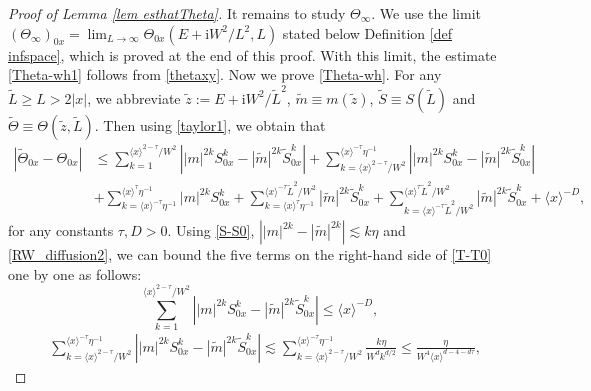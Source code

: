 \documentclass{article}
\newcommand{\1}{\mathds{1}}
\numberwithin{equation}{section}
\newcommand{\be}{\begin{equation}}
\newcommand{\ee}{\end{equation}}
\newcommand{\wh}{\widehat}
\newcommand{\wt}{\widetilde}
\newcommand{\ii}{\mathrm{i}} %
\renewcommand{\leq}{\leqslant}
\renewcommand{\geq}{\geqslant}
\renewcommand{\le}{\leq}
\renewcommand{\ge}{\geq}
\DeclareMathOperator{\OO}{O}
\theoremstyle{plain} %
\theoremstyle{remark}
\begin{document}
\begin{proof}[Proof of Lemma \ref{lem esthatTheta}]
It remains to study $\Theta_\infty$. We use the limit $(\Theta_\infty)_{0x}=\lim_{L\to\infty}\Theta_{0x}(E+\ii W^2/L^2,L)$ stated below Definition \ref{def infspace}, which is proved at the end of this proof. With this limit, the estimate \eqref{Theta-wh1} follows from \eqref{thetaxy}. Now we prove \eqref{Theta-wh}. For any $\wt L\ge L >  2|x|$, we abbreviate $\wt z:=E+\ii W^2/\wt L^2$, $\wt m\equiv m(\wt z)$, $\wt S\equiv S(\wt L)$ and $\wt\Theta\equiv \Theta(\wt z, \wt L) $. Then using \eqref{taylor1}, we obtain that 
\begin{align}
 \left|\wt\Theta_{0x}  - \Theta_{0x}\right| &\le \sum_{k=1}^{ \langle x\rangle^{2-\tau}/W^2} \left||m|^{2k}S^k_{0x} -|\wt m|^{2k}\wt S^k _{0x}\right| + \sum_{k= \langle x\rangle^{2-\tau}/W^2}^{\langle x\rangle^{-\tau}\eta^{-1}} \left||m|^{2k}S^k_{0x} -|\wt m|^{2k}\wt S^k _{0x}\right|   \nonumber\\
&+ \sum_{k=\langle x\rangle^{-\tau}\eta^{-1}}^{\langle x\rangle^\tau\eta^{-1}} |m|^{2k} S^k_{0x}+ \sum_{k=\langle x\rangle^\tau \eta^{-1}}^{ \langle x\rangle^{-\tau}\wt L^2/W^2} |\wt m|^{2k} \wt S^k_{0x} + \sum_{k=\langle x\rangle^{-\tau}\wt L^2/W^2}^{\langle x\rangle^\tau \wt L^2/W^2} |\wt m|^{2k} \wt S^k_{0x}+ \langle x\rangle^{-D} ,\label{T-T0}
\end{align}
for any constants $\tau,D>0$. 
Using \eqref{S-S0}, $\left||m|^{2k}-|\wt m|^{2k}\right|\lesssim k \eta$ and \eqref{RW_diffusion2}, we can bound the five terms on the right-hand side of \eqref{T-T0} one by one as follows: 
\be \nonumber%
\sum_{k=1}^{ \langle x\rangle^{2-\tau}/W^2} \left||m|^{2k}S^k_{0x} -|\wt m|^{2k}\wt S^k _{0x}\right| \le   \langle x\rangle ^{-D},
\ee
\begin{align} \nonumber%
&  \sum_{k= \langle x\rangle^{2-\tau}/W^2}^{\langle x\rangle^{-\tau}\eta^{-1}} \left||m|^{2k}S^k_{0x} -|\wt m|^{2k}\wt S^k _{0x}\right|  \lesssim \sum_{k= \langle x\rangle^{2-\tau}/W^2}^{\langle x\rangle^{-\tau}\eta^{-1}} \frac{k\eta}{W^dk^{d/2}}   \le  \frac{\eta  }{W^4\langle x\rangle^{d-4 -d\tau}}  ,

\end{align}
\end{proof}
\end{document}
